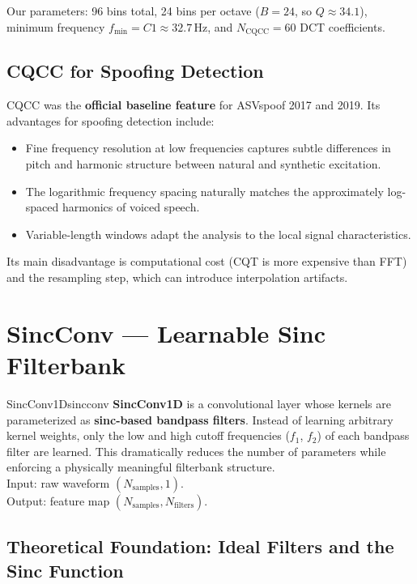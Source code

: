 \documentclass[12pt]{report}
\begin{document}
Our parameters: 96 bins total, 24 bins per octave ($B=24$, so $Q \approx 34.1$), minimum
frequency $f_\text{min} = C1 \approx 32.7$\,Hz, and $N_\text{CQCC} = 60$ DCT coefficients.

\subsection{CQCC for Spoofing Detection}

CQCC was the \textbf{official baseline feature} for ASVspoof 2017 and 2019. Its advantages
for spoofing detection include:
\begin{itemize}
    \item Fine frequency resolution at low frequencies captures subtle differences in pitch
          and harmonic structure between natural and synthetic excitation.
    \item The logarithmic frequency spacing naturally matches the approximately log-spaced
          harmonics of voiced speech.
    \item Variable-length windows adapt the analysis to the local signal characteristics.
\end{itemize}

Its main disadvantage is computational cost (CQT is more expensive than FFT) and the
resampling step, which can introduce interpolation artifacts.


\section{SincConv --- Learnable Sinc Filterbank}

\begin{dfnbox}{SincConv1D}{sincconv}
    \textbf{SincConv1D} is a convolutional layer whose kernels are parameterized as
    \textbf{sinc-based bandpass filters}. Instead of learning arbitrary kernel weights, only
    the low and high cutoff frequencies ($f_1$, $f_2$) of each bandpass filter are learned.
    This dramatically reduces the number of parameters while enforcing a physically meaningful
    filterbank structure. \\
    Input: raw waveform $(N_\text{samples}, 1)$. \\
    Output: feature map $(N_\text{samples}, N_\text{filters})$.
\end{dfnbox}

\subsection{Theoretical Foundation: Ideal Filters and the Sinc Function}
\end{document}
